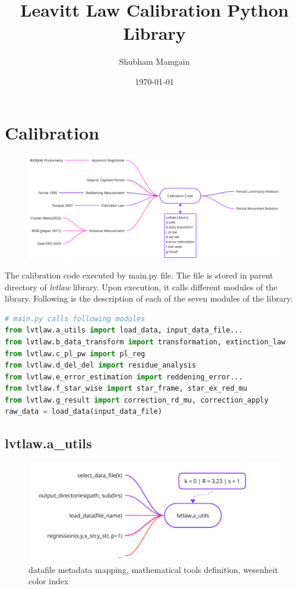 \documentclass{article}
\begin{document}
\title{Leavitt Law Calibration Python Library}
\author{Shubham Mamgain}
\date{\today}

\maketitle

\section{Calibration}

\begin{figure}[h!]
\includegraphics[width=\textwidth]{./figures/calibration.png}
\end{figure}


The calibration code executed by main.py file. The file is stored in parent directory of \textit{lvtlaw} library. Upon execution, it calls different modules of the library. Following is the description of each of the seven modules of the library.
\begin{lstlisting}[language=Python]
# main.py calls following modules
from lvtlaw.a_utils import load_data, input_data_file...
from lvtlaw.b_data_transform import transformation, extinction_law
from lvtlaw.c_pl_pw import pl_reg     
from lvtlaw.d_del_del import residue_analysis
from lvtlaw.e_error_estimation import reddening_error...
from lvtlaw.f_star_wise import star_frame, star_ex_red_mu
from lvtlaw.g_result import correction_rd_mu, correction_apply
raw_data = load_data(input_data_file)
\end{lstlisting}


\newpage
\subsection{lvtlaw.a\_utils}


\begin{figure}[h!]
\caption{\small datafile metadata mapping, mathematical tools definition, wesenheit color index}
\includegraphics[width=\textwidth]{./figures/a_utils.png}
\end{figure}
\end{document}
